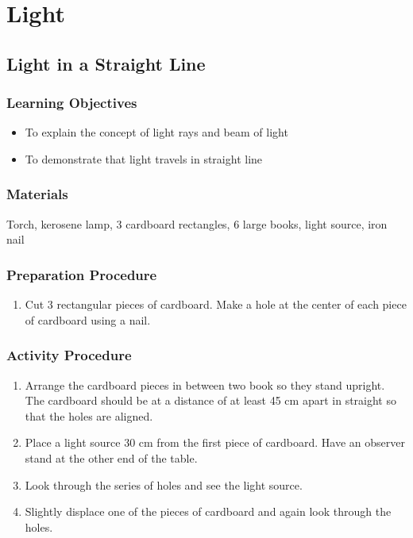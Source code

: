 \section{Light}

\subsection{Light in a Straight Line}

\subsubsection*{Learning Objectives}
\begin{itemize}
\item{To explain the concept of light rays and beam of light} 
\item{To demonstrate that light travels in straight line} 
\end{itemize}

\subsubsection*{Materials}
Torch, kerosene lamp, 3 cardboard rectangles, 6 large books, light source, iron nail

\subsubsection*{Preparation Procedure}
\begin{enumerate}
\item{Cut 3 rectangular pieces of cardboard. Make a hole at the center of each piece of cardboard using a nail.} 
\end{enumerate}

\subsubsection*{Activity Procedure}
\begin{enumerate}
\item{Arrange the cardboard pieces in between two book so they stand upright. The cardboard should be at a distance of at least 45 cm apart in straight so that the holes are aligned.} 
\item{Place a light source 30 cm from the first piece of cardboard. Have an observer stand at the other end of the table.} 
\item{Look through the series of holes and see the light source.}
\item{Slightly displace one of the pieces of cardboard and again look through the holes.}
\end{enumerate}

